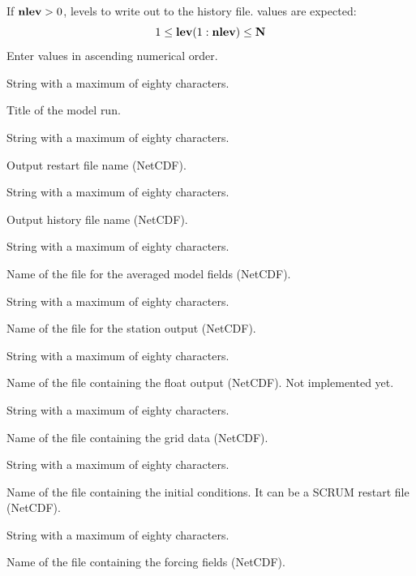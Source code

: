 \begin{klist}
\begin{klist}
         If $\mbox{\bf nlev}>0$, levels to write out to the
    history file.   values are expected:
\[
                       1 \leq \mbox{\bf lev}(1:\mbox{\bf nlev}) \leq \mbox{\bf N}
\]
            Enter values in ascending numerical order.
     \end{klist}
     String with a maximum of eighty characters.
     \begin{klist}
           Title of the model run.
     \end{klist}
     String with a maximum of eighty characters.
     \begin{klist}
         Output restart file name (NetCDF).
     \end{klist}
     String with a maximum of eighty characters.
     \begin{klist}
         Output history file name (NetCDF).
     \end{klist}
     String with a maximum of eighty characters.
     \begin{klist}
         Name of the file for the averaged model fields
     (NetCDF).
     \end{klist}
     String with a maximum of eighty characters.
     \begin{klist}
         Name of the file for the station output
    (NetCDF).
     \end{klist}
     String with a maximum of eighty characters.
     \begin{klist}
         Name of the file containing the float output
     (NetCDF). Not implemented yet.
     \end{klist}
     String with a maximum of eighty characters.
     \begin{klist}
         Name of the file containing the grid data
     (NetCDF).
     \end{klist}
     String with a maximum of eighty characters.
     \begin{klist}
         Name of the file containing the initial
     conditions.  It can be a SCRUM restart file (NetCDF).
     \end{klist}
     String with a maximum of eighty characters.
     \begin{klist}
         Name of the file containing the forcing fields
     (NetCDF).

\end{klist}
\end{klist}
